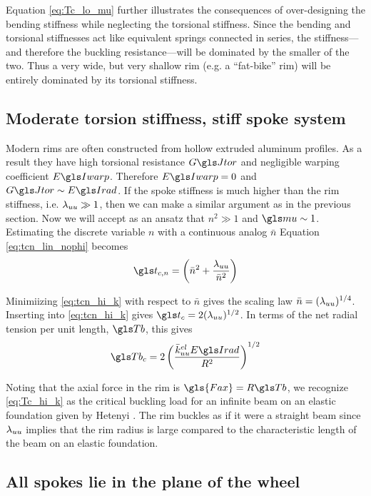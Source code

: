 \documentclass[\rootdir/thesis.tex]{subfiles}
\begin{document}
Equation \eqref{eq:Tc_lo_mu} further illustrates the consequences of over-designing the bending stiffness while neglecting the torsional stiffness. Since the bending and torsional stiffnesses act like equivalent springs connected in series, the stiffness---and therefore the buckling resistance---will be dominated by the smaller of the two. Thus a very wide, but very shallow rim (e.g. a ``fat-bike'' rim) will be entirely dominated by its torsional stiffness.

\subsection{Moderate torsion stiffness, stiff spoke system}
Modern rims are often constructed from hollow extruded aluminum profiles. As a result they have high torsional resistance $\GJ$ and negligible warping coefficient $\EIw$. Therefore $\EIw=0$ and $\GJ \sim \EIr$. If the spoke stiffness is much higher than the rim stiffness, i.e. $\lambda_{uu} \gg 1$, then we can make a similar argument as in the previous section. Now we will accept as an ansatz that $n^2 \gg 1$ and $\m \sim 1$. Estimating the discrete variable $n$ with a continuous analog $\bar{n}$ Equation \eqref{eq:tcn_lin_nophi} becomes
\begin{equation}
\label{eq:tcn_hi_k}
\ts_{c,n} = \left(\bar{n}^2 + \frac{\lr_{uu}}{\bar{n}^2}\right)
\end{equation}

Minimiizing \eqref{eq:tcn_hi_k} with respect to $\bar{n}$ gives the scaling law $\bar{n}=(\lambda_{uu})^{1/4}$. Inserting into \eqref{eq:tcn_hi_k} gives $\ts_c = 2(\lr_{uu})^{1/2}$. In terms of the net radial tension per unit length, $\Tb$, this gives
\begin{equation}
\label{eq:Tc_hi_k}
\Tb_c = 2 \left(\frac{\kuu^{el}\EIr}{R^2}\right)^{1/2}
\end{equation}

Noting that the axial force in the rim is $\gls{Fax}=R\Tb$, we recognize \eqref{eq:Tc_hi_k} as the critical buckling load for an infinite beam on an elastic foundation given by Hetenyi \cite{Hetenyi1946}. The rim buckles as if it were a straight beam since $\lambda_{uu}$ implies that the rim radius is large compared to the characteristic length of the beam on an elastic foundation.

\subsection{All spokes lie in the plane of the wheel}
\end{document}
